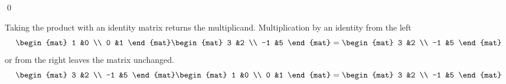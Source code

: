 \documentclass[10pt,t]{beamer}
\begin{document}
\begin{frame}
\lm[lm:ColsAndRowsInMatrixMult]
\end{frame}
\begin{frame}
\pf
{}
\qed
\end{frame}




\begin{frame}
\df[df:MainDiagonal]
\pause
\df[df:IdentityMatrix]
\pause
Taking the product with an identity matrix returns the multiplicand. 
\ex
Multiplication by an identity from the left
\begin{equation*}
  \begin{mat}
    1  &0 \\
    0  &1
  \end{mat}
  \begin{mat}
    3  &2  \\
   -1  &5
  \end{mat}
  =
  \begin{mat}
    3  &2  \\
   -1  &5
  \end{mat}
\end{equation*}
or from the right leaves the matrix unchanged.
\begin{equation*}
  \begin{mat}
    3  &2  \\
   -1  &5
  \end{mat}
  \begin{mat}
    1  &0 \\
    0  &1
  \end{mat}
  =
  \begin{mat}
    3  &2  \\
   -1  &5
  \end{mat}
\end{equation*}
\end{frame}
\end{document}
